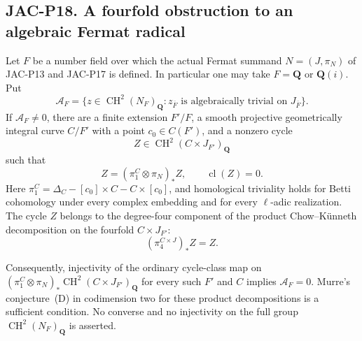 \subsection*{JAC-P18. A fourfold obstruction to an algebraic Fermat radical}

\begin{proposition}[JAC-P18]\label{jac:P18}
Let $F$ be a number field over which the actual Fermat summand
$N=(J,\pi_N)$ of JAC-P13 and JAC-P17 is defined. In particular one
may take $F=\mathbf Q$ or $\mathbf Q(i)$. Put
\[
 \mathcal A_F=\{z\in\operatorname{CH}^2(N_F)_{\mathbf Q}:
       z_{\overline F}\text{ is algebraically trivial on }
       J_{\overline F}\}.
\]
If $\mathcal A_F\ne0$, there are a finite extension $F'/F$, a
smooth projective geometrically integral curve $C/F'$ with a point
$c_0\in C(F')$, and a nonzero cycle
\[
 Z\in\operatorname{CH}^2(C\times J_{F'})_{\mathbf Q}
\]
such that
\[
  Z=(\pi_1^C\otimes\pi_N)_*Z,
       \qquad \operatorname{cl}(Z)=0.
                                                        \tag{P18.1}
\]
Here
$\pi_1^C=\Delta_C-[c_0]\times C-C\times[c_0]$,
and homological triviality holds for Betti cohomology under every
complex embedding and for every $\ell$-adic realization.
The cycle $Z$ belongs to the degree-four component of the product
Chow--K\"unneth decomposition on the fourfold $C\times J_{F'}$:
\[
                 (\pi_4^{C\times J})_*Z=Z.             \tag{P18.2}
\]

Consequently, injectivity of the ordinary cycle-class map on
$(\pi_1^C\otimes\pi_N)_*\operatorname{CH}^2(C\times J_{F'})_{
\mathbf Q}$ for every such $F'$ and $C$ implies
$\mathcal A_F=0$. Murre's conjecture~(D) in codimension two for
these product decompositions is a sufficient condition. No
converse and no injectivity on the full group
$\operatorname{CH}^2(N_F)_{\mathbf Q}$ is asserted.
\end{proposition}

